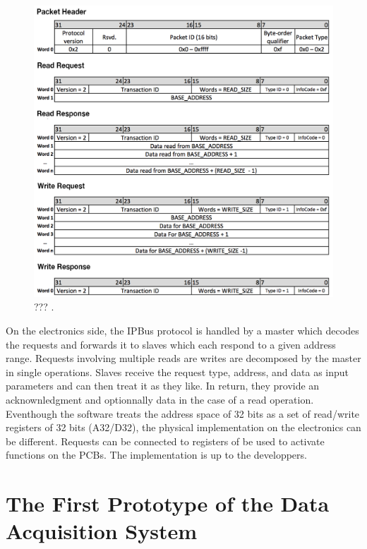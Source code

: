       \begin{figure}[h!]
        \centering
        \includegraphics[width=\textwidth]{img/II-2-daq/ipbus.png}
        \caption{??? \cite{AMC13}.}
        \label{fig:II-2-ipbus}
      \end{figure}

      On the electronics side, the IPBus protocol is handled by a master which decodes the requests and forwards it to slaves which each respond to a given address range. Requests involving multiple reads are writes are decomposed by the master in single operations. Slaves receive the request type, address, and data as input parameters and can then treat it as they like. In return, they provide an acknownledgment and optionnally data in the case of a read operation. Eventhough the software treats the address space of 32 bits as a set of read/write registers of 32 bits (A32/D32), the physical implementation on the electronics can be different. Requests can be connected to registers of be used to activate functions on the PCBs. The implementation is up to the developpers.

  \section{The First Prototype of the Data Acquisition System}

